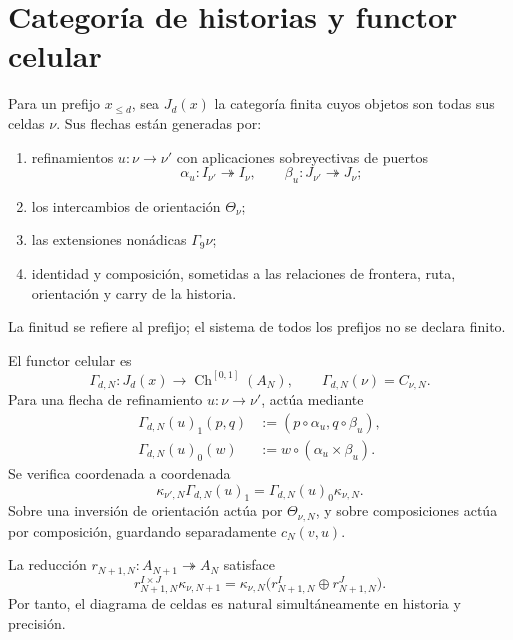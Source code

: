 \section{Categoría de historias y functor celular}
\label{sec:pdfv2-coh-category}

Para un prefijo \(x_{\leq d}\), sea \(J_d(x)\) la categoría finita cuyos
objetos son todas sus celdas \(\nu\). Sus flechas están generadas por:
\begin{enumerate}
 \item refinamientos \(u:\nu\to\nu'\) con aplicaciones sobreyectivas de
       puertos
       \[
        \alpha_u:I_{\nu'}\twoheadrightarrow I_\nu,
        \qquad
        \beta_u:J_{\nu'}\twoheadrightarrow J_\nu;
       \]
 \item los intercambios de orientación \(\Theta_\nu\);
 \item las extensiones nonádicas \(\Gamma_9\nu\);
 \item identidad y composición, sometidas a las relaciones de frontera,
       ruta, orientación y carry de la historia.
\end{enumerate}
La finitud se refiere al prefijo; el sistema de todos los prefijos no se
declara finito.

El functor celular es
\begin{equation}\label{eq:pdfv2-coh-gamma-functor}
 \Gamma_{d,N}:J_d(x)\longrightarrow
 \operatorname{Ch}^{[0,1]}(A_N),
 \qquad
 \Gamma_{d,N}(\nu)=C_{\nu,N}.
\end{equation}
Para una flecha de refinamiento \(u:\nu\to\nu'\), actúa mediante
\begin{align}
 \Gamma_{d,N}(u)_1(p,q)
 &:=(p\circ\alpha_u,q\circ\beta_u),
 \label{eq:pdfv2-coh-gamma-one}\\
 \Gamma_{d,N}(u)_0(w)
 &:=w\circ(\alpha_u\times\beta_u).
 \label{eq:pdfv2-coh-gamma-zero}
\end{align}
Se verifica coordenada a coordenada
\begin{equation}\label{eq:pdfv2-coh-gamma-chain-map}
 \kappa_{\nu',N}\Gamma_{d,N}(u)_1
 =\Gamma_{d,N}(u)_0\kappa_{\nu,N}.
\end{equation}
Sobre una inversión de orientación actúa por
\(\Theta_{\nu,N}\), y sobre composiciones actúa por composición, guardando
separadamente \(c_N(v,u)\).

La reducción \(r_{N+1,N}:A_{N+1}\twoheadrightarrow A_N\) satisface
\begin{equation}\label{eq:pdfv2-coh-kappa-reduction}
 r_{N+1,N}^{I\times J}\kappa_{\nu,N+1}
 =\kappa_{\nu,N}
  \bigl(r_{N+1,N}^{I}\oplus r_{N+1,N}^{J}\bigr).
\end{equation}
Por tanto, el diagrama de celdas es natural simultáneamente en historia y
precisión.

